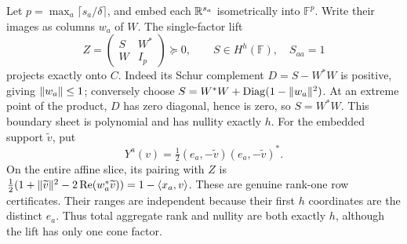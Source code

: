 \begin{example}\label{ex:packing}
Let $p=\max_a\lceil s_a/\delta\rceil$, and embed each $\mathbb R^{s_a}$
isometrically into $\mathbb F^p$. Write their images as columns $w_a$
of $W$. The single-factor lift
\begin{equation}\label{eq:column-packing}
 Z=\begin{pmatrix}S&W^*\\W&I_p\end{pmatrix}\succeq0,
 \qquad S\in H^h(\mathbb F),\quad S_{aa}=1
\end{equation}
projects exactly onto $C$. Indeed its Schur complement
$D=S-W^*W$ is positive, giving $\lVert w_a\rVert\leq1$; conversely choose
$S=W^*W+\operatorname{Diag}(1-\lVert w_a\rVert^2)$.
At an extreme point of the product, $D$ has zero diagonal, hence is
zero, so $S=W^*W$. This boundary sheet is polynomial and has nullity
exactly $h$.
For the embedded support $\widetilde v$, put
\[
 Y^a(v)=\tfrac12(e_a,-\widetilde v)(e_a,-\widetilde v)^*.
\]
On the entire affine slice, its pairing with $Z$ is
$\tfrac12(1+\lVert \widetilde v\rVert^2-2\operatorname{Re}(w_a^*\widetilde v))
=1-\langle x_a,v\rangle$. These are genuine rank-one row certificates. Their ranges
are independent because their first $h$ coordinates are the distinct
$e_a$. Thus total aggregate rank and nullity are both exactly $h$,
although the lift has only one cone factor.
\end{example}
